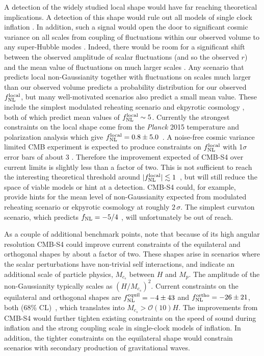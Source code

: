 A detection of the widely studied local shape would have far reaching theoretical implications. A detection of this shape would rule out all models of single clock inflation \cite{Creminelli:2004yq}. In addition, such a signal would open the door to significant cosmic variance on all scales from coupling of fluctuations within our observed volume to any super-Hubble modes \cite{Nelson:2012sb,LoVerde:2013xka,Nurmi:2013xv}. Indeed, there would be room for a significant shift between the observed amplitude of scalar fluctuations (and so the observed $r$) and the mean value of fluctuations on much larger scales \cite{Bonga:2015urq}. Any scenario that predicts local non-Gaussianity together with fluctuations on scales much larger than our observed volume predicts a probability distribution for our observed $f_{\rm NL}^{\rm local}$, but many well-motivated scenarios also predict a small mean value. These include the simplest modulated reheating scenario \cite{Zaldarriaga:2003my} and ekpyrotic cosmology \cite{Lehners:2009ja}, both of which predict mean values of $f_{\rm NL}^{\rm local}\sim5$. 
Currently the strongest constraints on the local shape come from the {\it Planck} 2015 temperature and polarization analysis which give $f_{\rm NL}^{\rm local} = 0.8 \pm 5.0$~\cite{Ade:2015ava}. A noise-free cosmic variance limited CMB experiment is expected to produce constraints on $f_{\rm NL}^{\rm local}$ with 1$\sigma$ error bars of about 3 \cite{Komatsu:2001rj}. Therefore the improvement expected of CMB-S4 over current limits is slightly less than a factor of two. This is not sufficient to reach the interesting theoretical threshold around $|f_{\rm NL}^{\rm local}|\lesssim 1$~\cite{Alvarez:2014vva}, but will still reduce the space of viable models or hint at a detection. CMB-S4 could, for example, provide hints for the mean level of non-Gaussianity expected from modulated reheating scenario or ekpyrotic cosmology at roughly $2\,\sigma$. The simplest curvaton scenario, which predicts $f_{\rm NL} = -5/4$ \cite{Lyth:2001nq}, will unfortunately be out of reach.

As a couple of additional benchmark points, note that because of its high angular resolution CMB-S4 could improve current constraints of the equilateral and orthogonal shapes by about a factor of two. These shapes arise in scenarios where the scalar perturbations have non-trivial self interactions, and indicate an additional scale of particle physics, $M_{c_s}$ between $H$ and $M_p$. The amplitude of the non-Gaussianity typically scales as $(H/M_{c_s})^2$. Current constraints on the equilateral and orthogonal shapes are $f_{\rm NL}^{\rm equil} = -4 \pm 43$ and $f_{\rm NL}^{\rm ortho} = -26 \pm 21$, both (68\% CL)~\cite{Ade:2015ava}, which translates into $M_{c_s}>\mathcal{O}(10)H$. The improvements from CMB-S4 would further tighten existing constraints on the speed of sound during inflation and the strong coupling scale in single-clock models of inflation. In addition, the tighter constraints on the equilateral shape would constrain scenarios with secondary production of gravitational waves.



